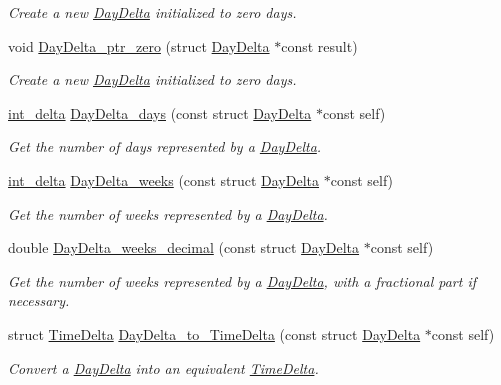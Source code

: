 \begin{DoxyCompactItemize}
\begin{DoxyCompactList}\small\item\em Create a new \hyperlink{structDayDelta}{Day\-Delta} initialized to zero days. \end{DoxyCompactList}\item 
void \hyperlink{day-delta_8h_a07b0ef860cf57d04ca3e5e5aaeae3e86}{Day\-Delta\-\_\-ptr\-\_\-zero} (struct \hyperlink{structDayDelta}{Day\-Delta} $\ast$const result)
\begin{DoxyCompactList}\small\item\em Create a new \hyperlink{structDayDelta}{Day\-Delta} initialized to zero days. \end{DoxyCompactList}\item 
\hyperlink{types_8h_a8a67cf99971c5cfeeaa2380ba84a4c92}{int\-\_\-delta} \hyperlink{day-delta_8h_aa57ce59c7908dcad9d8dcc18c84909a6}{Day\-Delta\-\_\-days} (const struct \hyperlink{structDayDelta}{Day\-Delta} $\ast$const self)
\begin{DoxyCompactList}\small\item\em Get the number of days represented by a \hyperlink{structDayDelta}{Day\-Delta}. \end{DoxyCompactList}\item 
\hyperlink{types_8h_a8a67cf99971c5cfeeaa2380ba84a4c92}{int\-\_\-delta} \hyperlink{day-delta_8h_ae0cf870931630123311dc3f532916813}{Day\-Delta\-\_\-weeks} (const struct \hyperlink{structDayDelta}{Day\-Delta} $\ast$const self)
\begin{DoxyCompactList}\small\item\em Get the number of weeks represented by a \hyperlink{structDayDelta}{Day\-Delta}. \end{DoxyCompactList}\item 
double \hyperlink{day-delta_8h_af6698416f241e2d9a6f54459fd0282ef}{Day\-Delta\-\_\-weeks\-\_\-decimal} (const struct \hyperlink{structDayDelta}{Day\-Delta} $\ast$const self)
\begin{DoxyCompactList}\small\item\em Get the number of weeks represented by a \hyperlink{structDayDelta}{Day\-Delta}, with a fractional part if necessary. \end{DoxyCompactList}\item 
struct \hyperlink{structTimeDelta}{Time\-Delta} \hyperlink{day-delta_8h_afaef350c558f8db4d84585c9bf64d871}{Day\-Delta\-\_\-to\-\_\-\-Time\-Delta} (const struct \hyperlink{structDayDelta}{Day\-Delta} $\ast$const self)
\begin{DoxyCompactList}\small\item\em Convert a \hyperlink{structDayDelta}{Day\-Delta} into an equivalent \hyperlink{structTimeDelta}{Time\-Delta}. \end{DoxyCompactList}\item 

\end{DoxyCompactItemize}
